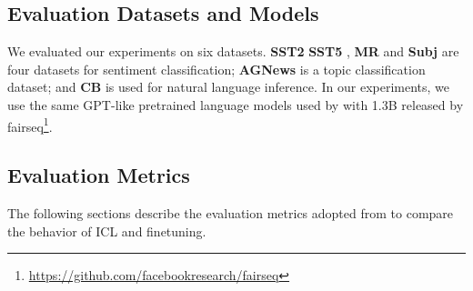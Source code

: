 \subsection{Evaluation Datasets and Models}

We evaluated our experiments on six datasets. \textbf{SST2} \cite{socher-etal-2013-recursive} \textbf{SST5} \cite{socher-etal-2013-recursive}, \textbf{MR} \cite{10.3115/1219840.1219855} and \textbf{Subj} \cite{10.3115/1218955.1218990} are four datasets for sentiment classification; \textbf{AGNews} \cite{NIPS2015_250cf8b5} is a topic classification dataset; and \textbf{CB} \cite{Marneffe2019TheCI} is used
for natural language inference.
In our experiments, we use the same GPT-like pretrained language models used by \cite{dai2023gpt} with 1.3B released by fairseq\footnote{\url{https://github.com/facebookresearch/fairseq}}. 

\subsection{Evaluation Metrics}

The following sections describe the evaluation metrics adopted from \cite{dai2023gpt} to compare the behavior of ICL and finetuning.


